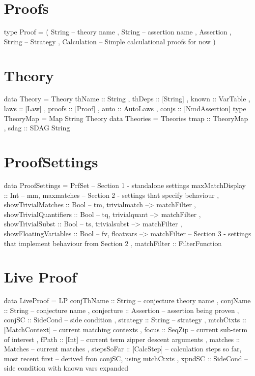 \section{Proofs}

\begin{code}
type Proof
  = ( String -- theory name
    , String -- assertion name
    , Assertion
    , String -- Strategy
    , Calculation -- Simple calculational proofs for now
    )
\end{code}

\newpage
\section{Theory}

\begin{code}
data Theory
  = Theory {
      thName      :: String
    , thDeps      :: [String]
    , known       :: VarTable
    , laws        :: [Law]
    , proofs      :: [Proof]
    , auto        :: AutoLaws
    , conjs       :: [NmdAssertion]
    }
type TheoryMap = Map String Theory
data Theories
  = Theories { tmap :: TheoryMap
             , sdag :: SDAG String }
\end{code}


\section{ProofSettings}

\begin{code}
data ProofSettings
  = PrfSet {
     -- Section 1 - standalone settings
       maxMatchDisplay :: Int -- mm, maxmatches
     -- Section 2 - settings that specify behaviour
     , showTrivialMatches :: Bool -- tm, trivialmatch --> matchFilter
     , showTrivialQuantifiers :: Bool -- tq, trivialquant --> matchFilter
     , showTrivialSubst :: Bool -- ts, trivialsubst --> matchFilter
     , showFloatingVariables :: Bool -- fv, floatvars --> matchFilter
     -- Section 3 - settings that implement behaviour from Section 2
     , matchFilter :: FilterFunction
     }
\end{code}


\section{Live Proof}

\begin{code}
data LiveProof
  = LP {
      conjThName :: String -- conjecture theory name
    , conjName :: String -- conjecture name
    , conjecture :: Assertion -- assertion being proven
    , conjSC :: SideCond -- side condition
    , strategy :: String -- strategy
    , mtchCtxts :: [MatchContext] -- current matching contexts
    , focus :: SeqZip  -- current sub-term of interest
    , fPath :: [Int] -- current term zipper descent arguments
    , matches :: Matches -- current matches
    , stepsSoFar :: [CalcStep]  -- calculation steps so far, most recent first
    -- derived fron conjSC, using mtchCtxts
    , xpndSC :: SideCond -- side condition with known vars expanded
    }

\end{code}

